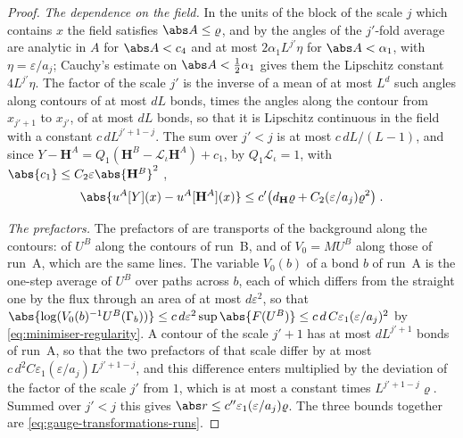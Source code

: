 \begin{proof}
\emph{The dependence on the field.} In the units of the block of the scale $j$ which contains $x$ the field satisfies $\abs A \leq \varrho$, and by \cite[Proposition~4 and (131), pp.~38--39]{BalabanAVG} the angles of the $j'$-fold average are analytic in $A$ for $\abs A < c_4$ and at most $2\alpha_1L^{j'}\eta$ for $\abs A < \alpha_1$, with $\eta = \varepsilon/a_j$; Cauchy's estimate on $\abs A < \frac{1}{2}\alpha_1$ gives them the Lipschitz constant $4L^{j'}\eta$. The factor of the scale $j'$ is the inverse of a mean of at most $L^d$ such angles along contours of at most $dL$ bonds, times the angles along the contour from $x_{j'+1}$ to $x_{j'}$, of at most $dL$ bonds, so that it is Lipschitz continuous in the field with a constant $c\,dL^{j'+1-j}$. The sum over $j' < j$ is at most $c\,dL/(L - 1)$, and since $Y - \mathbf H^A = Q_1(\mathbf H^B - \mathcal L_\iota\mathbf H^A) + c_1$, by $Q_1\mathcal L_\iota = 1$, with $\abs{c_1} \leq C_2\varepsilon\abs{\mathbf H^B}^2$ \cite[(44)]{BalabanVAR},
\[
    \abs{u^A[Y](x) - u^A[\mathbf H^A](x)} \leq c'\bigl(d_{\mathbf H}\varrho + C_2(\varepsilon/a_j)\varrho^2\bigr)\;.
\]

\emph{The prefactors.} The prefactors of \cite[(106)]{BalabanAVG} are transports of the background along the contours: of $U^B$ along the contours of run~B, and of $V_0 = MU^B$ along those of run~A, which are the same lines. The variable $V_0(b)$ of a bond $b$ of run~A is the one-step average of $U^B$ over paths across $b$, each of which differs from the straight one by the flux through an area of at most $d\varepsilon^2$, so that $\abs{\log(V_0(b)^{-1}U^B(\Gamma_b))} \leq c\,d\varepsilon^2\sup\abs{F(U^B)} \leq c\,d\,C\varepsilon_1(\varepsilon/a_j)^2$ by \eqref{eq:minimiser-regularity}. A contour of the scale $j' + 1$ has at most $dL^{j'+1}$ bonds of run~A, so that the two prefactors of that scale differ by at most $c\,d^2C\varepsilon_1(\varepsilon/a_j)L^{j'+1-j}$, and this difference enters multiplied by the deviation of the factor of the scale $j'$ from $1$, which is at most a constant times $L^{j'+1-j}\varrho$. Summed over $j' < j$ this gives $\abs r \leq c''\varepsilon_1(\varepsilon/a_j)\varrho$. The three bounds together are \eqref{eq:gauge-transformations-runs}.
\end{proof}
